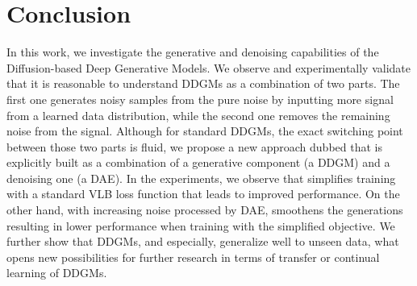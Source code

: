 \newpage











\section{Conclusion}
In this work, we investigate the generative and denoising capabilities of the Diffusion-based Deep Generative Models. We observe and experimentally validate that it is reasonable to understand DDGMs as a combination of two parts. The first one generates noisy samples from the pure noise by inputting more signal from a learned data distribution, while the second one removes the remaining noise from the signal. Although for standard DDGMs, the exact switching point between those two parts is fluid, we propose a new approach dubbed \ours{} that is explicitly built as a combination of a generative component (a DDGM) and a denoising one (a DAE). 
In the experiments, we observe that \ours{} simplifies training with a standard VLB loss function that leads to improved performance. On the other hand, with increasing noise processed by DAE, \ours{} smoothens the generations resulting in lower performance when training with the simplified objective. 
We further show that DDGMs, and \ours{} especially, generalize well to unseen data, what opens new possibilities for further research in terms of transfer or continual learning of DDGMs.

